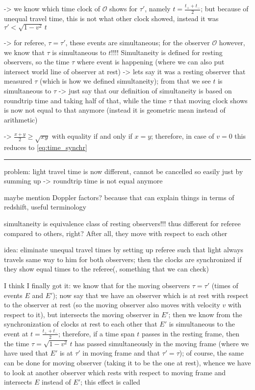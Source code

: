 -> we know which time clock of $\mathcal{O}$ shows for $\tau'$, namely $t = \frac{t_+ + t_-}{2}$; but because of unequal travel time, this is not what other clock showed, instead it was $\tau' < \sqrt{1 - v^2} \, t$

-> for referee, $\tau = \tau'$, these events are simultaneous; for the observer $\mathcal{O}$ however, we know that $\tau$ is simultaneous to $t$!!!! Simultaneity is defined for resting observers, so the time $\tau$ where event is happening (where we can also put intersect world line of observer at rest) -> lets say it was a resting observer that measured $\tau$ (which is how we defined simultaneity); from that we see $t$ is simultaneous to $\tau$ -> just say that our definition of simultaneity is based on roundtrip time and taking half of that, while the time $\tau$ that moving clock shows is now not equal to that anymore (instead it is geometric mean instead of arithmetic)

-> $\frac{x + y}{2} \geq \sqrt{x y}$ with equality if and only if $x = y$; therefore, in case of $v = 0$ this reduces to \eqref{eq:time_synchr}


\hrule


problem: light travel time is now different, cannot be cancelled so easily just by summing up -> roundtrip time is not equal anymore


maybe mention Doppler factors? because that can explain things in terms of redshift, useful terminology


simultaneity is equivalence class of resting observers!!! thus different for referee compared to others, right? After all, they move with respect to each other

idea: eliminate unequal travel times by setting up referee such that light always travels same way to him for both observers; then the clocks are synchronized if they show equal times to the referee(, something that we can check)


I think I finally got it: we know that for the moving observers $\tau = \tau'$ (times of events $E$ and $E'$); now say that we have an observer which is at rest with respect to the observer at rest (so the moving observer also moves with velocity $v$ with respect to it), but intersects the moving observer in $E'$; then we know from the synchronization of clocks at rest to each other that $E'$ is simultaneous to the event at $t = \frac{t_+ + t_-}{2}$; therefore, if a time span $t$ passes in the resting frame, then the time $\tau = \sqrt{1 - v^2} \, t$ has passed simultaneously in the moving frame (where we have used that $E'$ is at $\tau'$ in moving frame and that $\tau' = \tau$); of course, the same can be done for moving observer (taking it to be the one at rest), whence we have to look at another observer which rests with respect to moving frame and intersects $E$ instead of $E'$; this effect is called 

